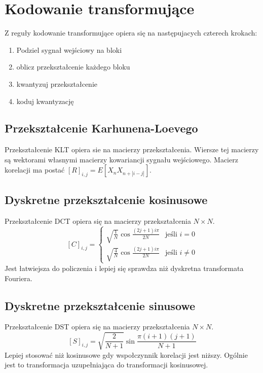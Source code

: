 \documentclass{../notatki}
\begin{document}
\section{Kodowanie transformujące}

Z reguły kodowanie transformujące opiera się na następujacych czterech krokach:
\begin{enumerate}
  \item Podziel sygnał wejściowy na bloki
  \item oblicz przekształcenie każdego bloku
  \item kwantyzuj przekształcenie
  \item koduj kwantyzację
\end{enumerate}

\subsection{Przekształcenie Karhunena-Loevego}

Przekształcenie KLT opiera sie na macierzy przekształcenia.
Wiersze tej macierzy są wektorami własnymi macierzy kowariancji sygnału
wejściowego. Macierz korelacji ma postać $[R]_{i,j} = E[X_nX_{n + |i - j|}]$.

\subsection{Dyskretne przekształcenie kosinusowe}

Przekształcenie DCT opiera się na macierzy przekształcenia $N \times N$.
$$
[C]_{i,j} =
\begin{cases}
  \sqrt{\frac{1}{N}} \cos \frac{(2j + 1)i\pi}{2N} & \text{jeśli } i = 0 \\
  \sqrt{\frac{4}{N}} \cos \frac{(2j + 1)i\pi}{2N} & \text{jeśli } i \neq 0
\end{cases}
$$
Jest łatwiejsza do policzenia i lepiej się sprawdza niż dyskretna
transformata Fouriera.

\subsection{Dyskretne przekształcenie sinusowe}

Przekształcenie DST opiera się na macierzy przekształcenia $N \times N$.
$$
[S]_{i,j} = \sqrt{\frac{2}{N + 1}} \sin \frac{\pi(i + 1)(j + 1)}{N + 1}
$$
Lepiej stosować niż kosinusowe gdy wspołczynnik korelacji jest niższy.
Ogólnie jest to transformacja uzupełniająca do transformacji kosinusowej.
\end{document}
